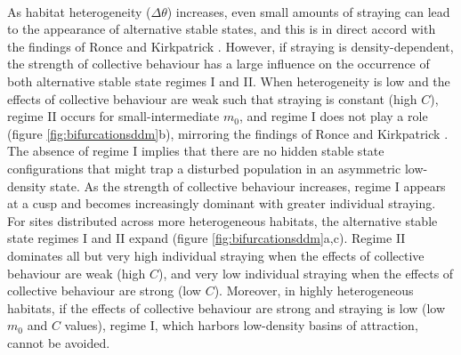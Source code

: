\documentclass{revtex4}
\begin{document}
\\
As habitat heterogeneity ($\Delta\theta$) increases, even small amounts of straying can lead to the appearance of alternative stable states, and this is in direct accord with the findings of Ronce and Kirkpatrick \citep{Ronce:2001dp}.
However, if straying is density-dependent, the strength of collective behaviour has a large influence on the occurrence of both alternative stable state regimes I and II.
When heterogeneity is low and the effects of collective behaviour are weak such that straying is constant (high $C$), regime II occurs for small-intermediate $m_0$, and regime I does not play a role (figure \ref{fig:bifurcationsddm}b), mirroring the findings of Ronce and Kirkpatrick \citep{Ronce:2001dp}.
The absence of regime I implies that there are no hidden stable state configurations that might trap a disturbed population in an asymmetric low-density state.
As the strength of collective behaviour increases, regime I appears at a cusp and becomes increasingly dominant with greater individual straying.
For sites distributed across more heterogeneous habitats, the alternative stable state regimes I and II expand (figure \ref{fig:bifurcationsddm}a,c).
Regime II dominates all but very high individual straying when the effects of collective behaviour are weak (high $C$), and very low individual straying when the effects of collective behaviour are strong (low $C$).
Moreover, in highly heterogeneous habitats, if the effects of collective behaviour are strong and straying is low (low $m_0$ and $C$ values), regime I, which harbors low-density basins of attraction, cannot be avoided.
\end{document}
